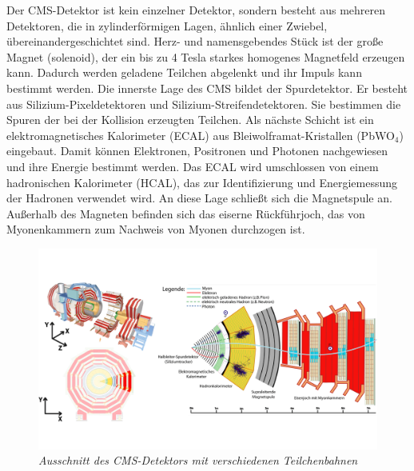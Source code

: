 Der CMS-Detektor ist kein einzelner Detektor, sondern besteht aus mehreren Detektoren, die in zylinderf\"ormigen Lagen, \"ahnlich einer Zwiebel, \"ubereinandergeschichtet sind. Herz- und namensgebendes St\"uck ist der gro\ss e Magnet (solenoid), der ein bis zu \num{4} Tesla starkes homogenes Magnetfeld erzeugen kann. Dadurch werden geladene Teilchen abgelenkt und ihr Impuls kann bestimmt werden. Die innerste Lage des CMS bildet der Spurdetektor. Er besteht aus Silizium-Pixeldetektoren und Silizium-Streifendetektoren. Sie bestimmen die Spuren der bei der Kollision erzeugten Teilchen. Als n\"achste Schicht ist ein elektromagnetisches Kalorimeter (ECAL) aus Bleiwolframat-Kristallen (PbWO$_4$) eingebaut. Damit können Elektronen, Positronen und Photonen nachgewiesen und ihre Energie bestimmt werden. Das ECAL wird umschlossen von einem hadronischen Kalorimeter (HCAL), das zur Identifizierung und Energiemessung der Hadronen verwendet wird. An diese Lage schlie\ss t sich die Magnetspule an. Au\ss erhalb des Magneten befinden sich das eiserne R\"uckf\"uhrjoch, das von Myonenkammern zum Nachweis von Myonen durchzogen ist.\\

\begin{figure}[hhh]
 \begin{center}
   \includegraphics[width=\textwidth]{graphics/cms_slice.png}
   \parbox[b]{12cm}{
     \caption[CMS-Detektor]
             {\label{fig:cms_slice} \it\!Ausschnitt des CMS-Detektors mit verschiedenen Teilchenbahnen \cite{cms_slice}}
   }
 \end{center}
\end{figure}


